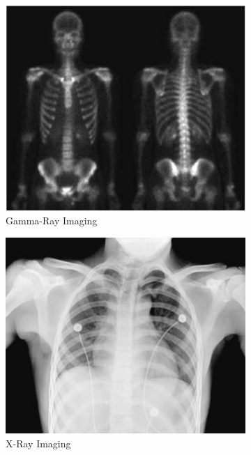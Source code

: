 \documentclass{amsproc}
\begin{document}
\begin{figure}[h]
\centering
\begin{subfigure}{.3\textwidth}
	\centering
	\includegraphics[scale=.25]{gamma.png}
	\caption{Gamma-Ray Imaging}
	\label{fig:sub5}
\end{subfigure} %
\begin{subfigure}{.3\textwidth}
	\centering
	\includegraphics[scale=.25]{xray.png}
	\caption{X-Ray Imaging}
	\label{fig:sub6}
\end{subfigure} %
\begin{subfigure}{.3\textwidth}

\end{subfigure}
\end{figure}
\end{document}
